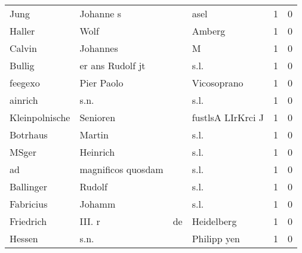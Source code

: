 \begin{center}
\begin{tiny}
\begin{longtabu}{llllrr}
                     Jung &                          Johanne s &             &                                        asel &          1 &         0 \\
                   Haller &                               Wolf &             &                                      Amberg &          1 &         0 \\
                   Calvin &                           Johannes &             &                                           M &          1 &         0 \\
                   Bullig &                   er ans Rudolf jt &             &                                        s.l. &          1 &         0 \\
                  feegexo &                         Pier Paolo &             &                                 Vicosoprano &          1 &         0 \\
                  ainrich &                               s.n. &             &                                        s.l. &          1 &         0 \\
           Kleinpolnische &                           Senioren &             &                           fustlsA LIrKrci J &          1 &         0 \\
                 Botrhaus &                             Martin &             &                                        s.l. &          1 &         0 \\
                    MSger &                           Heinrich &             &                                        s.l. &          1 &         0 \\
                       ad &                 magnificos quosdam &             &                                        s.l. &          1 &         0 \\
                Ballinger &                             Rudolf &             &                                        s.l. &          1 &         0 \\
                Fabricius &                             Johamm &             &                                        s.l. &          1 &         0 \\
                Friedrich &                             III. r &          de &                                  Heidelberg &          1 &         0 \\
                   Hessen &                               s.n. &             &                                 Philipp yen &          1 &         0 \\

\end{longtabu}
\end{tiny}
\end{center}
